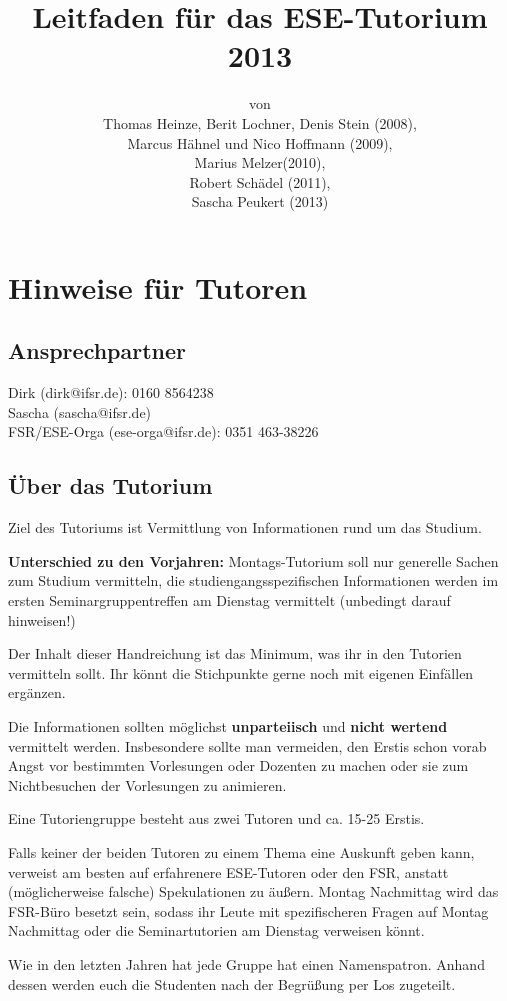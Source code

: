 \documentclass[a4paper,12pt]{report}
\begin{document}
\title{Leitfaden für das ESE-Tutorium 2013\\}
\date{}
\author{von\\Thomas Heinze, Berit Lochner, Denis Stein (2008), \\Marcus Hähnel und Nico Hoffmann (2009), \\Marius Melzer(2010), \\Robert Schädel (2011),\\Sascha Peukert (2013)}
\maketitle

\chapter{Hinweise für Tutoren}
\section{Ansprechpartner}
Dirk (dirk@ifsr.de): 0160 8564238\\
Sascha (sascha@ifsr.de) \\
FSR/ESE-Orga (ese-orga@ifsr.de): 0351 463-38226

\section{Über das Tutorium}
\begin{itemize*}
\item Ziel des Tutoriums ist Vermittlung von Informationen rund um das Studium.
\item\textbf{Unterschied zu den Vorjahren:} Montags-Tutorium soll nur generelle Sachen zum Studium vermitteln, die studiengangsspezifischen Informationen werden im ersten Seminargruppentreffen am Dienstag vermittelt (unbedingt darauf hinweisen!) 
\item Der Inhalt dieser Handreichung ist das Minimum, was ihr in den Tutorien vermitteln sollt. Ihr könnt die Stichpunkte gerne noch mit eigenen Einfällen ergänzen.
\item Die Informationen sollten möglichst \textbf{unparteiisch} und \textbf{nicht wertend} vermittelt werden. Insbesondere sollte man vermeiden, den Erstis schon vorab Angst vor bestimmten Vorlesungen oder Dozenten zu machen oder sie zum Nichtbesuchen der Vorlesungen zu animieren.
\item Eine Tutoriengruppe besteht aus zwei Tutoren und ca. 15-25 Erstis.
\item Falls keiner der beiden Tutoren zu einem Thema eine Auskunft geben kann, verweist am besten auf erfahrenere ESE-Tutoren oder den FSR, anstatt (möglicherweise falsche) Spekulationen zu äußern. Montag Nachmittag wird das FSR-Büro besetzt sein, sodass ihr Leute mit spezifischeren Fragen auf Montag Nachmittag oder die Seminartutorien am Dienstag verweisen könnt.
\item Wie in den letzten Jahren hat jede Gruppe hat einen Namenspatron. Anhand dessen werden euch die Studenten nach der Begrüßung per Los zugeteilt.
\end{itemize*}
\end{document}
